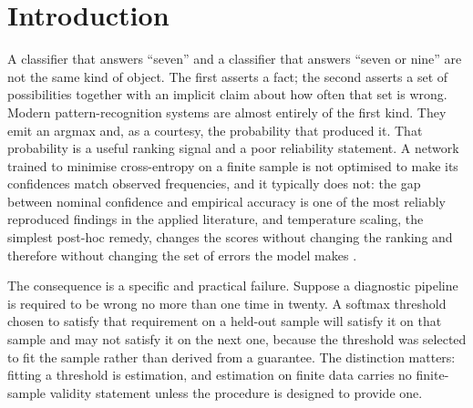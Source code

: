 \documentclass[a4paper,longmktitle]{cas-sc}
\begin{document}
\maketitle

\section{Introduction}

A classifier that answers ``seven'' and a classifier that answers ``seven or nine'' are not the same kind of object. The first asserts a fact; the second asserts a set of possibilities together with an implicit claim about how often that set is wrong. Modern pattern-recognition systems are almost entirely of the first kind. They emit an argmax and, as a courtesy, the probability that produced it. That probability is a useful ranking signal and a poor reliability statement. A network trained to minimise cross-entropy on a finite sample is not optimised to make its confidences match observed frequencies, and it typically does not: the gap between nominal confidence and empirical accuracy is one of the most reliably reproduced findings in the applied literature, and temperature scaling, the simplest post-hoc remedy, changes the scores without changing the ranking and therefore without changing the set of errors the model makes \cite{Guo2017}.

The consequence is a specific and practical failure. Suppose a diagnostic pipeline is required to be wrong no more than one time in twenty. A softmax threshold chosen to satisfy that requirement on a held-out sample will satisfy it on that sample and may not satisfy it on the next one, because the threshold was selected to fit the sample rather than derived from a guarantee. The distinction matters: fitting a threshold is estimation, and estimation on finite data carries no finite-sample validity statement unless the procedure is designed to provide one.
\end{document}
